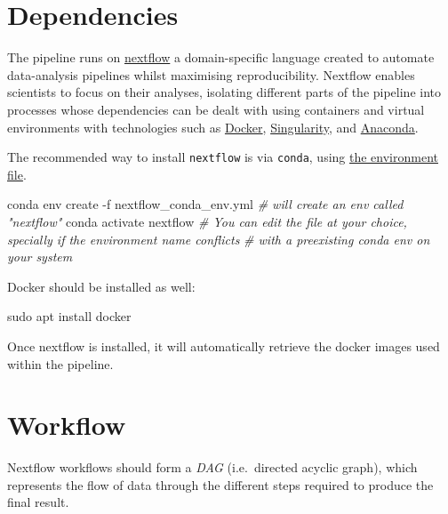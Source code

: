 \documentclass[
  openany]{book}
\newenvironment{Shaded}{\begin{snugshade}}{\end{snugshade}}
\newcommand{\AttributeTok}[1]{\textcolor[rgb]{0.77,0.63,0.00}{#1}}
\newcommand{\CommentTok}[1]{\textcolor[rgb]{0.56,0.35,0.01}{\textit{#1}}}
\newcommand{\ExtensionTok}[1]{#1}
\newcommand{\FunctionTok}[1]{\textcolor[rgb]{0.00,0.00,0.00}{#1}}
\newcommand{\NormalTok}[1]{#1}
\begin{document}
\hypertarget{dependencies}{%
\chapter{Dependencies}\label{dependencies}}

The pipeline runs on \href{https://www.nextflow.io/}{nextflow} a domain-specific language created to automate data-analysis pipelines whilst maximising reproducibility.
Nextflow enables scientists to focus on their analyses, isolating different parts of the pipeline into processes whose dependencies can be dealt with using containers and virtual environments with technologies such as \href{https://www.docker.com/}{Docker}, \href{https://singularity.hpcng.org/}{Singularity}, and \href{https://www.anaconda.com/products/individual}{Anaconda}.

The recommended way to install \texttt{nextflow} is via \texttt{conda}, using \href{https://github.com/bio-TAGI/Hackathon/blob/main/nextflow_conda_env.yml}{the environment file}.

\begin{Shaded}
\begin{Highlighting}[]
\ExtensionTok{conda}\NormalTok{ env create }\AttributeTok{{-}f}\NormalTok{ nextflow\_conda\_env.yml }\CommentTok{\# will create an env called "nextflow"}
\ExtensionTok{conda}\NormalTok{ activate nextflow}
\CommentTok{\# You can edit the file at your choice, specially if the environment name conflicts}
\CommentTok{\# with a preexisting conda env on your system}
\end{Highlighting}
\end{Shaded}

Docker should be installed as well:

\begin{Shaded}
\begin{Highlighting}[]
\FunctionTok{sudo}\NormalTok{ apt install docker}
\end{Highlighting}
\end{Shaded}

Once nextflow is installed, it will automatically retrieve the docker images used within the pipeline.

\hypertarget{workflow}{%
\chapter{Workflow}\label{workflow}}

Nextflow workflows should form a \emph{DAG} (i.e.~directed acyclic graph), which represents the flow of data through the different steps
required to produce the final result.
\end{document}
